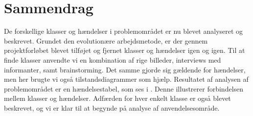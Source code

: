\section{Sammendrag}

De forskellige klasser og hændelser i problemområdet er nu blevet analyseret og beskrevet. Grundet den evolutionære arbejdsmetode, er der gennem projektforløbet blevet tilføjet og fjernet klasser og hændelser igen og igen. Til at finde klasser anvendte vi en kombination af rige billeder, interviews med informanter, samt brainstorming. Det samme gjorde sig gældende for hændelser, men her brugte vi også tilstandsdiagrammer som hjælp. Resultatet af analysen af problemområdet er en hændelsestabel, som ses i . Denne illustrerer forbindelsen mellem klasser og hændelser. Adfærden for hver enkelt klasse er også blevet beskrevet, og vi er klar til at begynde på analyse af anvendelsesområde. 